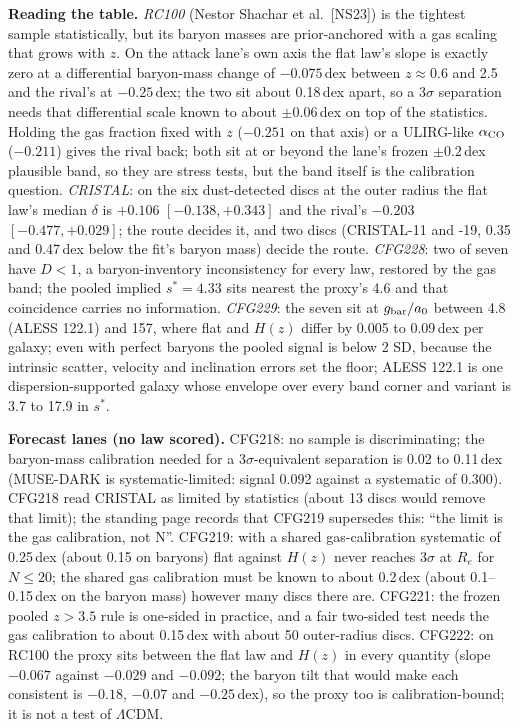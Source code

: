 \documentclass[10pt]{article}
\begin{document}
\textbf{Reading the table.} \emph{RC100} (Nestor Shachar et al.\ [NS23]) is the tightest sample statistically, but its baryon masses are prior-anchored with a gas scaling that grows with $z$. On the attack lane's own axis the flat law's slope is exactly zero at a differential baryon-mass change of $-0.075$\,dex between $z\approx0.6$ and 2.5 and the rival's at $-0.25$\,dex; the two sit about 0.18\,dex apart, so a 3$\sigma$ separation needs that differential scale known to about $\pm0.06$\,dex on top of the statistics. Holding the gas fraction fixed with $z$ ($-0.251$ on that axis) or a ULIRG-like $\alpha_{\rm CO}$ ($-0.211$) gives the rival back; both sit at or beyond the lane's frozen $\pm0.2$\,dex plausible band, so they are stress tests, but the band itself is the calibration question. \emph{CRISTAL}: on the six dust-detected discs at the outer radius the flat law's median $\delta$ is $+0.106$ $[-0.138,+0.343]$ and the rival's $-0.203$ $[-0.477,+0.029]$; the route decides it, and two discs (CRISTAL-11 and -19, 0.35 and 0.47\,dex below the fit's baryon mass) decide the route. \emph{CFG228}: two of seven have $D<1$, a baryon-inventory inconsistency for every law, restored by the gas band; the pooled implied $s^*=4.33$ sits nearest the proxy's 4.6 and that coincidence carries no information. \emph{CFG229}: the seven sit at $g_{\rm bar}/a_0$ between 4.8 (ALESS 122.1) and 157, where flat and $H(z)$ differ by 0.005 to 0.09\,dex per galaxy; even with perfect baryons the pooled signal is below 2 SD, because the intrinsic scatter, velocity and inclination errors set the floor; ALESS 122.1 is one dispersion-supported galaxy whose envelope over every band corner and variant is 3.7 to 17.9 in $s^*$.

\textbf{Forecast lanes (no law scored).} CFG218: no sample is discriminating; the baryon-mass calibration needed for a 3$\sigma$-equivalent separation is 0.02 to 0.11\,dex (MUSE-DARK is systematic-limited: signal 0.092 against a systematic of 0.300). CFG218 read CRISTAL as limited by statistics (about 13 discs would remove that limit); the standing page records that CFG219 supersedes this: ``the limit is the gas calibration, not N''. CFG219: with a shared gas-calibration systematic of 0.25\,dex (about 0.15 on baryons) flat against $H(z)$ never reaches 3$\sigma$ at $R_e$ for $N\le20$; the shared gas calibration must be known to about 0.2\,dex (about 0.1--0.15\,dex on the baryon mass) however many discs there are. CFG221: the frozen pooled $z>3.5$ rule is one-sided in practice, and a fair two-sided test needs the gas calibration to about 0.15\,dex with about 50 outer-radius discs. CFG222: on RC100 the proxy sits between the flat law and $H(z)$ in every quantity (slope $-0.067$ against $-0.029$ and $-0.092$; the baryon tilt that would make each consistent is $-0.18$, $-0.07$ and $-0.25$\,dex), so the proxy too is calibration-bound; it is not a test of $\Lambda$CDM.
\end{document}
